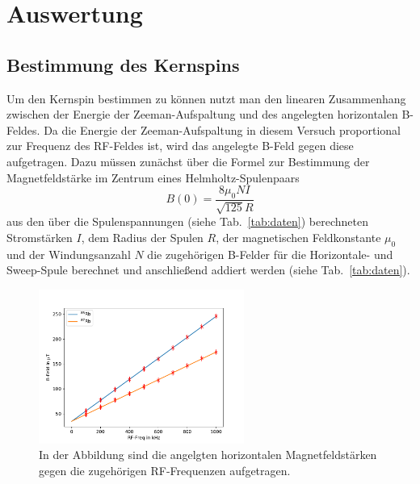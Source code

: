 \newpage
\section{Auswertung}
    \subsection{Bestimmung des Kernspins}
        Um den Kernspin bestimmen zu können nutzt man den linearen Zusammenhang zwischen der Energie der Zeeman-Aufspaltung und des angelegten horizontalen B-Feldes. Da die Energie der Zeeman-Aufspaltung 
        in diesem Versuch proportional zur Frequenz des RF-Feldes ist, wird das angelegte B-Feld gegen diese aufgetragen. Dazu müssen zunächst über die Formel zur Bestimmung der Magnetfeldstärke im Zentrum 
        eines Helmholtz-Spulenpaars
        \begin{equation}
            B(0) = \frac{8\mu_0 N I }{\sqrt{125}R}
            \label{eqn:b_helm}
        \end{equation}
        \noindent
        aus den über die Spulenspannungen (siehe Tab.~\ref{tab:daten}) berechneten Stromstärken $I$, dem Radius der Spulen $R$, der magnetischen Feldkonstante $\mu_0$ und der Windungsanzahl $N$ die zugehörigen B-Felder 
        für die Horizontale- und Sweep-Spule berechnet und anschließend addiert werden (siehe Tab.~\ref{tab:daten}).  
        
        \FloatBarrier

        \begin{figure}[h]
          \centering
          \includegraphics[width = 0.6\textwidth]{pictures/Rb_85_87.pdf}
          \caption{In der Abbildung sind die angelgten horizontalen Magnetfeldstärken gegen die zugehörigen RF-Frequenzen aufgetragen. }
          \label{fig:B_gegen_RF}
        \end{figure}

        \FloatBarrier

